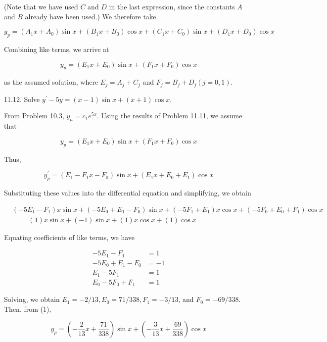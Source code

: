 \documentclass[10pt]{article}
\begin{document}
(Note that we have used $C$ and $D$ in the last expression, since the constants $A$ and $B$ already have been used.) We therefore take

$$
y_{p}=\left(A_{1} x+A_{0}\right) \sin x+\left(B_{1} x+B_{0}\right) \cos x+\left(C_{1} x+C_{0}\right) \sin x+\left(D_{1} x+D_{0}\right) \cos x
$$

Combining like terms, we arrive at

$$
y_{p}=\left(E_{1} x+E_{0}\right) \sin x+\left(F_{1} x+F_{0}\right) \cos x
$$

as the assumed solution, where $E_{j}=A_{j}+C_{j}$ and $F_{j}=B_{j}+D_{j}(j=0,1)$.

11.12. Solve $y^{\prime}-5 y=(x-1) \sin x+(x+1) \cos x$.

From Problem 10.3, $y_{h}=c_{1} e^{5 x}$. Using the results of Problem 11.11, we assume that


\begin{equation*}
y_{p}=\left(E_{1} x+E_{0}\right) \sin x+\left(F_{1} x+F_{0}\right) \cos x \tag{1}
\end{equation*}


Thus,

$$
y_{p}^{\prime}=\left(E_{1}-F_{1} x-F_{0}\right) \sin x+\left(E_{1} x+E_{0}+E_{1}\right) \cos x
$$

Substituting these values into the differential equation and simplifying, we obtain

$$
\begin{aligned}
& \left(-5 E_{1}-F_{1}\right) x \sin x+\left(-5 E_{0}+E_{1}-F_{0}\right) \sin x+\left(-5 F_{1}+E_{1}\right) x \cos x+\left(-5 F_{0}+E_{0}+F_{1}\right) \cos x \\
& \quad=(1) x \sin x+(-1) \sin x+(1) x \cos x+(1) \cos x
\end{aligned}
$$

Equating coefficients of like terms, we have

$$
\begin{aligned}
-5 E_{1}-F_{1} & =1 \\
-5 E_{0}+E_{1}-F_{0} & =-1 \\
E_{1}-5 F_{1} & =1 \\
E_{0}-5 F_{0}+F_{1} & =1
\end{aligned}
$$

Solving, we obtain $E_{1}=-2 / 13, E_{0}=71 / 338, F_{1}=-3 / 13$, and $F_{0}=-69 / 338$. Then, from (1),

$$
y_{p}=\left(-\frac{2}{13} x+\frac{71}{338}\right) \sin x+\left(-\frac{3}{13} x+\frac{69}{338}\right) \cos x
$$
\end{document}
